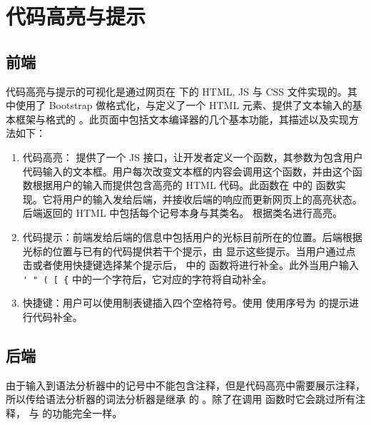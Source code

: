 \section{代码高亮与提示}

\subsection{前端}

代码高亮与提示的可视化是通过网页在  下的 HTML, JS 与 CSS 文件实现的。其中使用了 Bootstrap 做格式化，与定义了一个 HTML 元素、提供了文本输入的基本框架与格式的 \href{https://github.com/WebCoder49/code-input}{} 。此页面中包括文本编译器的几个基本功能，其描述以及实现方法如下：

\begin{enumerate}
    \item 代码高亮： 提供了一个 JS 接口，让开发者定义一个函数，其参数为包含用户代码输入的文本框。用户每次改变文本框的内容会调用这个函数，并由这个函数根据用户的输入而提供包含高亮的 HTML 代码。此函数在  中的  函数实现。它将用户的输入发给后端，并接收后端的响应而更新网页上的高亮状态。后端返回的 HTML 中包括每个记号本身与其类名。 根据类名进行高亮。
    \item 代码提示：前端发给后端的信息中包括用户的光标目前所在的位置。后端根据光标的位置与已有的代码提供若干个提示，由  显示这些提示。当用户通过点击或者使用快捷键选择某个提示后， 中的  函数将进行补全。此外当用户输入 \lstinline`' " ( [ {` 中的一个字符后，它对应的字符将自动补全。
    \item 快捷键：用户可以使用制表键插入四个空格符号。使用  使用序号为  的提示进行代码补全。
\end{enumerate}

\subsection{后端}

由于输入到语法分析器中的记号中不能包含注释，但是代码高亮中需要展示注释，所以传给语法分析器的词法分析器是继承  的 。除了在调用  函数时它会跳过所有注释， 与  的功能完全一样。